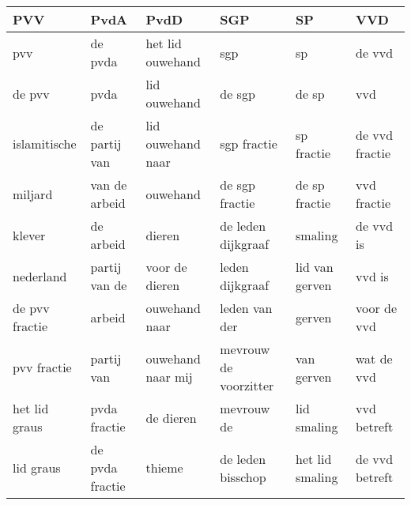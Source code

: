 \begin{tabular}{llllll}
\toprule
            PVV &             PvdA &               PvdD &                    SGP &               SP &             VVD \\
\midrule
            pvv &          de pvda &   het lid ouwehand &                    sgp &               sp &          de vvd \\
         de pvv &             pvda &       lid ouwehand &                 de sgp &            de sp &             vvd \\
   islamitische &    de partij van &  lid ouwehand naar &            sgp fractie &       sp fractie &  de vvd fractie \\
        miljard &    van de arbeid &           ouwehand &         de sgp fractie &    de sp fractie &     vvd fractie \\
         klever &        de arbeid &             dieren &     de leden dijkgraaf &          smaling &       de vvd is \\
      nederland &    partij van de &     voor de dieren &        leden dijkgraaf &   lid van gerven &          vvd is \\
 de pvv fractie &           arbeid &      ouwehand naar &          leden van der &           gerven &     voor de vvd \\
    pvv fractie &       partij van &  ouwehand naar mij &  mevrouw de voorzitter &       van gerven &      wat de vvd \\
  het lid graus &     pvda fractie &          de dieren &             mevrouw de &      lid smaling &     vvd betreft \\
      lid graus &  de pvda fractie &             thieme &      de leden bisschop &  het lid smaling &  de vvd betreft \\
\bottomrule
\end{tabular}

